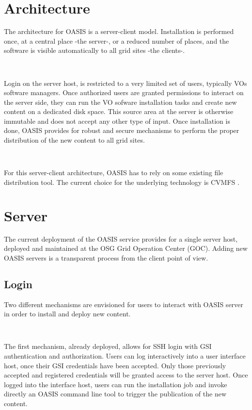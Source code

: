 \documentclass[a4paper]{jpconf}
\begin{document}
\section{Architecture}

The architecture for OASIS is a server-client model. 
Installation is performed once, at a central place -the server-, 
or a reduced number of places,
and the software is visible automatically to all grid sites -the clients-.  

~

Login on the server host, 
is restricted to a very limited set of users,
typically VOs software managers. 
Once authorized users are granted permissions to interact on the server side, 
they can run the VO sofware installation tasks and create new content on a dedicated disk space.
This  source area at the server is otherwise immutable and 
does not accept any other type of input.
Once installation is done, OASIS provides for robust and secure mechanisms 
to perform the proper distribution of the new content to all grid sites. 

~

For this server-client architecture, OASIS has to rely on some existing file distribution tool.
The current choice for the underlying technology is CVMFS \cite{cvmfs}.


\section{Server}

The current deployment of the OASIS service provides for a single server host,
deployed and maintained at the OSG Grid Operation Center (GOC).
Adding new OASIS servers is a transparent process from the client point of view.


\subsection{Login}

Two different mechanisms are envisioned for users 
to interact with OASIS server in order to install and deploy new content.

~

The first mechanism, already deployed, allows for SSH \cite{ssh} login with GSI
\cite{gsi} authentication and authorization.
Users can log interactively into a user interface host,
once their GSI credentials have been accepted.
Only those previously accepted and registered credentials will be granted access to the server host.
Once logged into the interface host, users can run the installation job
and invoke directly an OASIS command line tool to trigger the publication of the new content.
\end{document}
